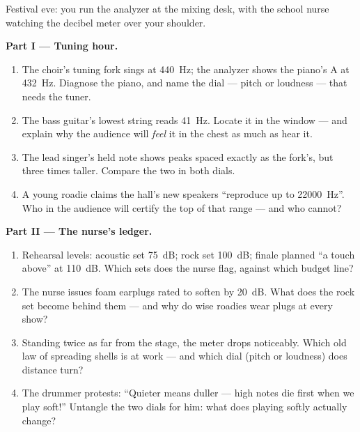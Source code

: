 \begin{problem}\label{pb:g8:sound-pitch-loudness:1}
Festival eve: you run the analyzer at the mixing desk, with
the school nurse watching the decibel meter over your
shoulder.

\medskip\noindent\textbf{Part I --- Tuning hour.}
\begin{enumerate}
  \item The choir's tuning fork sings at \qty{440}{Hz}; the
        analyzer shows the piano's A at \qty{432}{Hz}.
        Diagnose the piano, and name the dial --- pitch or
        loudness --- that needs the tuner.
  \item The bass guitar's lowest string reads \qty{41}{Hz}.
        Locate it in the  window --- and explain why
        the audience will \emph{feel} it in the chest as
        much as hear it.
  \item The lead singer's held note shows peaks spaced
        exactly as the fork's, but three times taller.
        Compare the two  in both dials.
  \item A young roadie claims the hall's new speakers
        ``reproduce up to \qty{22000}{Hz}''. Who in the
        audience will certify the top of that range ---
        and who cannot?
\end{enumerate}

\medskip\noindent\textbf{Part II --- The nurse's ledger.}
\begin{enumerate}[resume]
  \item Rehearsal levels: acoustic set \qty{75}{dB}; rock
        set \qty{100}{dB}; finale planned ``a touch above''
        at \qty{110}{dB}. Which sets does the nurse flag,
        against which budget line?
  \item The nurse issues foam earplugs rated to soften
         by \qty{20}{dB}. What does the rock set
        become behind them --- and why do wise roadies wear
        plugs at every show?
  \item Standing twice as far from the stage, the meter
        drops noticeably. Which old law of spreading
        shells is at work --- and which dial (pitch or
        loudness) does distance turn?
  \item The drummer protests: ``Quieter means duller ---
        high notes die first when we play soft!'' Untangle
        the two dials for him: what does playing softly
        actually change?
\end{enumerate}


\end{problem}
